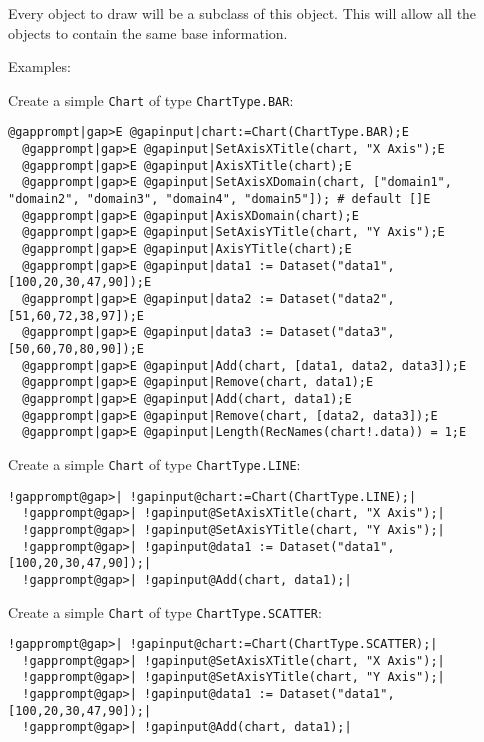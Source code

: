 \documentclass[a4paper,11pt]{report}
\begin{document}
{{{ Every object to draw will be a subclass of this object. This will allow all
the objects to contain the same base information. 

 Examples: 

 Create a simple \texttt{Chart} of type \texttt{ChartType.BAR}: 
\begin{Verbatim}[commandchars=@|E,fontsize=\small,frame=single,label=Example]
  @gapprompt|gap>E @gapinput|chart:=Chart(ChartType.BAR);E
  @gapprompt|gap>E @gapinput|SetAxisXTitle(chart, "X Axis");E
  @gapprompt|gap>E @gapinput|AxisXTitle(chart);E
  @gapprompt|gap>E @gapinput|SetAxisXDomain(chart, ["domain1", "domain2", "domain3", "domain4", "domain5"]); # default []E
  @gapprompt|gap>E @gapinput|AxisXDomain(chart);E
  @gapprompt|gap>E @gapinput|SetAxisYTitle(chart, "Y Axis");E
  @gapprompt|gap>E @gapinput|AxisYTitle(chart);E
  @gapprompt|gap>E @gapinput|data1 := Dataset("data1", [100,20,30,47,90]);E
  @gapprompt|gap>E @gapinput|data2 := Dataset("data2", [51,60,72,38,97]);E
  @gapprompt|gap>E @gapinput|data3 := Dataset("data3", [50,60,70,80,90]);E
  @gapprompt|gap>E @gapinput|Add(chart, [data1, data2, data3]);E
  @gapprompt|gap>E @gapinput|Remove(chart, data1);E
  @gapprompt|gap>E @gapinput|Add(chart, data1);E
  @gapprompt|gap>E @gapinput|Remove(chart, [data2, data3]);E
  @gapprompt|gap>E @gapinput|Length(RecNames(chart!.data)) = 1;E
\end{Verbatim}
 

 Create a simple \texttt{Chart} of type \texttt{ChartType.LINE}: 
\begin{Verbatim}[commandchars=!@|,fontsize=\small,frame=single,label=Example]
  !gapprompt@gap>| !gapinput@chart:=Chart(ChartType.LINE);|
  !gapprompt@gap>| !gapinput@SetAxisXTitle(chart, "X Axis");|
  !gapprompt@gap>| !gapinput@SetAxisYTitle(chart, "Y Axis");|
  !gapprompt@gap>| !gapinput@data1 := Dataset("data1", [100,20,30,47,90]);|
  !gapprompt@gap>| !gapinput@Add(chart, data1);|
\end{Verbatim}
 

 Create a simple \texttt{Chart} of type \texttt{ChartType.SCATTER}: 
\begin{Verbatim}[commandchars=!@|,fontsize=\small,frame=single,label=Example]
  !gapprompt@gap>| !gapinput@chart:=Chart(ChartType.SCATTER);|
  !gapprompt@gap>| !gapinput@SetAxisXTitle(chart, "X Axis");|
  !gapprompt@gap>| !gapinput@SetAxisYTitle(chart, "Y Axis");|
  !gapprompt@gap>| !gapinput@data1 := Dataset("data1", [100,20,30,47,90]);|
  !gapprompt@gap>| !gapinput@Add(chart, data1);|
\end{Verbatim}
 

}}}
\end{document}
